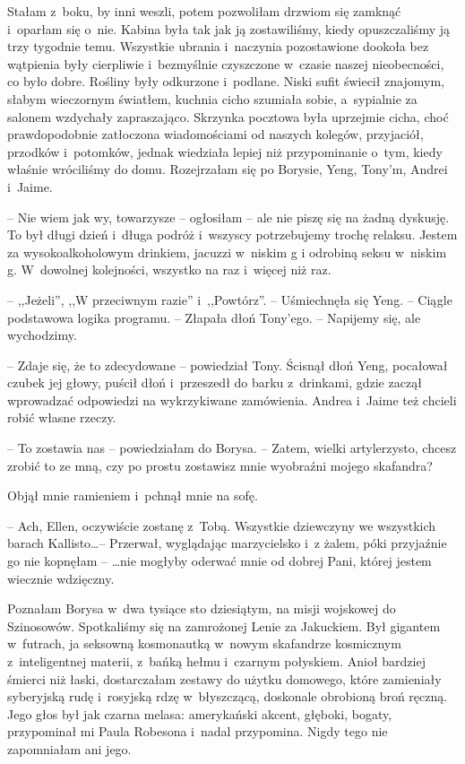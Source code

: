 \documentclass[oneside,polish,11pt,sfheadings]{mwbk}
\begin{document}
Stałam z~boku, by inni weszli, potem pozwoliłam drzwiom się zamknąć i~oparłam się o~nie. Kabina była tak jak ją zostawiliśmy, kiedy
opuszczaliśmy ją trzy tygodnie temu. Wszystkie ubrania i~naczynia
pozostawione dookoła bez wątpienia były cierpliwie i~bezmyślnie
czyszczone w~czasie naszej nieobecności, co było dobre. Rośliny były
odkurzone i~podlane. Niski sufit świecił znajomym, słabym wieczornym
światłem, kuchnia cicho szumiała sobie, a~sypialnie za salonem wzdychały
zapraszająco. Skrzynka pocztowa była uprzejmie cicha, choć
prawdopodobnie zatłoczona wiadomościami od naszych kolegów, przyjaciół,
przodków i~potomków, jednak wiedziała lepiej niż przypominanie o~tym,
kiedy właśnie wróciliśmy do domu. Rozejrzałam się po Borysie, Yeng,
Tony'm, Andrei i~Jaime.

-- Nie wiem jak wy, towarzysze -- ogłosiłam -- ale nie piszę się na żadną
dyskusję. To był długi dzień i~długa podróż i~wszyscy potrzebujemy
trochę relaksu. Jestem za wysokoalkoholowym drinkiem, jacuzzi w~niskim g
i odrobiną seksu w~niskim g. W~dowolnej kolejności, wszystko na raz i~więcej niż raz.

-- ,,Jeżeli'', ,,W przeciwnym razie'' i~,,Powtórz''. -- Uśmiechnęła się
Yeng. -- Ciągle podstawowa logika programu. -- Złapała dłoń Tony'ego. -- Napijemy się, ale wychodzimy.

-- Zdaje się, że to zdecydowane -- powiedział Tony. Ścisnął dłoń Yeng,
pocałował czubek jej głowy, puścił dłoń i~przeszedł do barku z~drinkami,
gdzie zaczął wprowadzać odpowiedzi na wykrzykiwane zamówienia. Andrea i~Jaime też chcieli robić własne rzeczy.

-- To zostawia nas -- powiedziałam do Borysa. -- Zatem, wielki
artylerzysto, chcesz zrobić to ze mną, czy po prostu zostawisz mnie
wyobraźni mojego skafandra?

Objął mnie ramieniem i~pchnął mnie na sofę. 

-- Ach, Ellen, oczywiście
zostanę z~Tobą. Wszystkie dziewczyny we wszystkich barach Kallisto\ldots  -- Przerwał, wyglądając marzycielsko i~z żalem, póki przyjaźnie go nie kopnęłam 
-- \ldots  nie mogłyby oderwać mnie od dobrej Pani, której jestem
wiecznie wdzięczny.

Poznałam Borysa w~dwa tysiące sto dziesiątym, na misji wojskowej do
Szinosowów. Spotkaliśmy się na zamrożonej Lenie za Jakuckiem. Był
gigantem w~futrach, ja seksowną kosmonautką w~nowym skafandrze
kosmicznym z~inteligentnej materii, z~bańką hełmu i~czarnym połyskiem.
Anioł bardziej śmierci niż łaski, dostarczałam zestawy do użytku
domowego, które zamieniały syberyjską rudę i~rosyjską rdzę w~błyszczącą,
doskonale obrobioną broń ręczną. Jego głos był jak czarna melasa:
amerykański akcent, głęboki, bogaty, przypominał mi Paula Robesona i~nadal przypomina. Nigdy tego nie zapomniałam ani jego.
\end{document}
